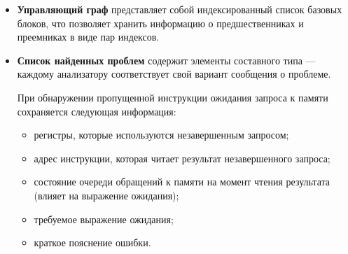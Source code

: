 \documentclass[a4paper,14pt]{extarticle}
\newenvironment{ul}{\begin{itemize}[noitemsep,topsep=0em]}{\end{itemize}\vspace{20pt}}
\newenvironment{inlineul}{\begin{itemize}[noitemsep,topsep=0em]}{\end{itemize}}
\begin{document}
{\begin{ul}
Операнды инструкций также делятся на классы — регистры, константные целые значения, константные
числа с плавающей запятой, выражения ожидания и т.д. Для эффективной работы с операндами
необходимо перевести их в вариантный тип:
\begin{verbatim}
data Operand = Osgpr [Int] | Ovgpr [Int]
             | Ovmcnt Int | Oexpcnt Int | Olgkmcnt Int
             | Oconst Int | Oconstf Float | Oother String
\end{verbatim}
\textit{При разработке новых методов анализа могут добавляться новые варианты. В текущей реализации
все неиспользуемые значения хранятся как вариант \texttt{Oother}.}

Удобство использования разработанного представления инструкций можно увидеть
на примере фрагмента кода, который обрабатывает переходы при восстановлении управляющего графа:
\begin{verbatim}
case instruction of
  Instruction ["s", "branch"] [Oconst off] ->
    -- Обработка безусловного перехода со смещением off
  Instruction ("s" : "cbranch" : _) [Oconst off] ->
    -- Обработка условного перехода со смещением off
  Instruction ("s" : "call" : _) [Osgpr [s1, s2], Oconst off] ->
    -- Обработка безусловного перехода со смещением off,
    -- при котором счетчик команд сохраняется
    -- в пару регистров с номерами (s1, s2)
\end{verbatim}

\item \textbf{Управляющий граф} представляет собой индексированный список базовых блоков,
  что позволяет хранить информацию о предшественниках и преемниках в виде пар индексов.

\item \textbf{Список найденных проблем} содержит элементы составного типа — каждому анализатору
соответствует свой вариант сообщения о проблеме.

При обнаружении пропущенной инструкции ожидания запроса к памяти сохраняется следующая информация:
\begin{inlineul}
\item регистры, которые используются незавершенным запросом;
\item адрес инструкции, которая читает результат незавершенного запроса;
\item состояние очереди обращений к памяти на момент чтения результата (влияет на выражение ожидания);
\item требуемое выражение ожидания;
\item краткое пояснение ошибки.
\end{inlineul}


\end{ul}}
\end{document}
